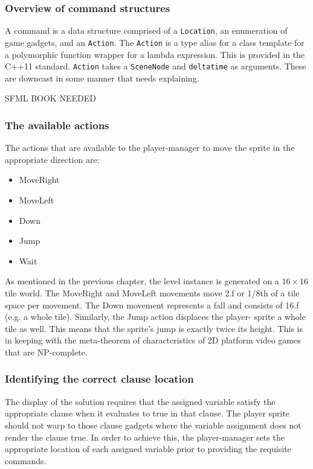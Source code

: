 \documentclass[11pt, a4paper, oneside]{report} %
\begin{document}
\subsubsection{Overview of command structures}

A command is a data structure comprised of a \texttt{Location}, an enumeration
of game gadgets, and an \texttt{Action}. The \texttt{Action} is a type alias for
a class template for a polymorphic function wrapper for a lambda expression.
This is provided in the C++11 standard. \texttt{Action} takes a
\texttt{SceneNode} and \texttt{delta\textunderscore time} as arguments. These
are downcast in some manner that needs explaining.

SFML BOOK NEEDED

\subsubsection{The available actions}

The actions that are available to the player-manager to move the sprite in the
appropriate direction are: 
\begin{itemize} 
  \item MoveRight 
  \item MoveLeft 
  \item Down 
  \item Jump 
  \item Wait
\end{itemize}

As mentioned in the previous chapter, the level instance is generated on a
$16\times 16$ tile world. The MoveRight and MoveLeft movements move 2.f or 1/8th
of a tile space per movement. The Down movement represents a fall and consists
of 16.f (e.g. a whole tile). Similarly, the Jump action displaces the player-
sprite a whole tile as well. This means that the sprite's jump is exactly twice
its height. This is in keeping with the meta-theorem of characteristics of 2D
platform video games that are NP-complete.

\subsubsection{Identifying the correct clause location}

The display of the solution requires that the assigned variable satisfy the
appropriate clause when it evaluates to true in that clause. The player sprite
should not warp to those clause gadgets where the variable assignment does not
render the clause true. In order to achieve this, the player-manager sets the
appropriate location of each assigned variable prior to providing the requisite
commands.
\end{document}
